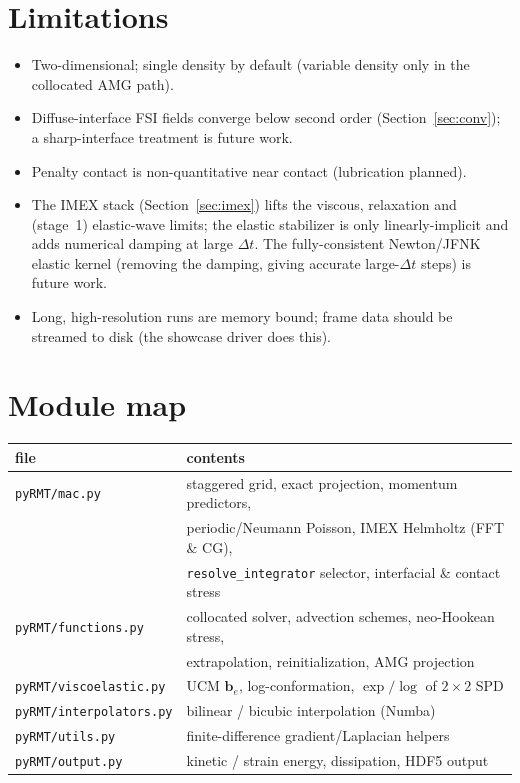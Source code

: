 \documentclass[11pt]{article}
\newcommand{\bten}{\bm{b}}
\begin{document}
\section{Limitations}
\label{sec:limits}
\begin{itemize}[nosep]
  \item Two-dimensional; single density by default (variable density only in the
  collocated AMG path).
  \item Diffuse-interface FSI fields converge below second order
  (Section~\ref{sec:conv}); a sharp-interface treatment is future work.
  \item Penalty contact is non-quantitative near contact (lubrication planned).
  \item The IMEX stack (Section~\ref{sec:imex}) lifts the viscous, relaxation and
  (stage~1) elastic-wave limits; the elastic stabilizer is only linearly-implicit and
  adds numerical damping at large $\Delta t$. The fully-consistent Newton/JFNK elastic
  kernel (removing the damping, giving accurate large-$\Delta t$ steps) is future work.
  \item Long, high-resolution runs are memory bound; frame data should be streamed
  to disk (the showcase driver does this).
\end{itemize}

\section{Module map}
\begin{center}
\begin{tabular}{ll}
\toprule
file & contents \\
\midrule
\texttt{pyRMT/mac.py} & staggered grid, exact projection, momentum predictors, \\
 & periodic/Neumann Poisson, IMEX Helmholtz (FFT \& CG), \\
 & \texttt{resolve\_integrator} selector, interfacial \& contact stress \\
\texttt{pyRMT/functions.py} & collocated solver, advection schemes, neo-Hookean stress, \\
 & extrapolation, reinitialization, AMG projection \\
\texttt{pyRMT/viscoelastic.py} & UCM $\bten_e$, log-conformation, $\exp/\log$ of $2{\times}2$ SPD \\
\texttt{pyRMT/interpolators.py} & bilinear / bicubic interpolation (Numba) \\
\texttt{pyRMT/utils.py} & finite-difference gradient/Laplacian helpers \\
\texttt{pyRMT/output.py} & kinetic / strain energy, dissipation, HDF5 output \\
\bottomrule
\end{tabular}
\end{center}
\end{document}
